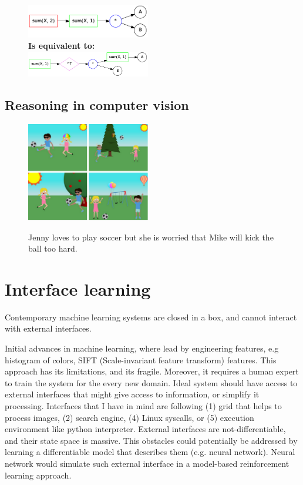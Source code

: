 \documentclass{article}
\begin{document}
\begin{figure}
  \centering
  \includegraphics[width=0.48\textwidth]{imgs/example1_brute.png}\\
  {\bf Is equivalent to:}\\
  \includegraphics[width=0.48\textwidth]{imgs/example1_opt.png}\\
  \caption{\cite{zaremba2014learning}}
\end{figure}


\subsection{Reasoning in computer vision}

\begin{figure}
  \centering
  \includegraphics[width=0.48\textwidth]{imgs/abstract.png}\\
  \caption{Jenny loves to play soccer but she is worried that Mike will kick the ball too hard.}
\end{figure}

\section{Interface learning}
Contemporary machine learning systems are closed in a box, and cannot 
interact with external interfaces. 


Initial advances in machine learning, where lead by engineering features, 
e.g histogram of colors, SIFT (Scale-invariant feature transform) features. 
This approach has its limitations, and its fragile. Moreover, it requires a 
human expert to train the system for the every new domain. Ideal system should 
have access to external interfaces that might give access to information, or simplify it processing. 
Interfaces that I have in mind are following (1) grid that helps to process images, (2) search engine, 
(4) Linux syscalls, or (5) execution environment like python interpreter. External interfaces are not-differentiable, 
and their state space is massive. This obstacles could potentially be addressed by learning a differentiable 
model that describes them (e.g. neural network). Neural network would simulate such external interface in a model-based reinforcement learning approach. 
\end{document}
